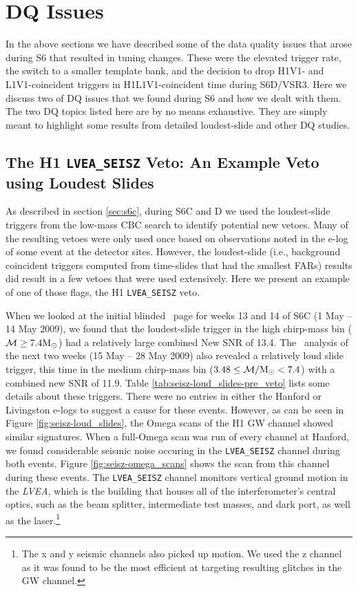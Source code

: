 \section{DQ Issues}
\label{sec:dq_issues}

In the above sections we have described some of the data quality issues that
arose during S6 that resulted in tuning changes. These were the elevated
trigger rate, the switch to a smaller template bank, and the decision to drop
H1V1- and L1V1-coincident triggers in H1L1V1-coincident time during S6D/VSR3.
Here we discuss two of \ac{DQ} issues that we found during \ac{S6} and how we
dealt with them. The two \ac{DQ} topics listed here are by no means exhaustive.
They are simply meant to highlight some results from detailed loudest-slide and
other DQ studies.

\subsection{The H1 \texttt{LVEA\_SEISZ} Veto: An Example Veto using Loudest Slides}
\label{sec:lvea_seismic}

As described in section \ref{sec:s6c}, during S6C and D we used the
loudest-slide triggers from the low-mass \ac{CBC} search to identify potential
new vetoes. Many of the resulting vetoes were only used once based on
observations noted in the e-log of some event at the detector sites. However,
the loudest-slide (i.e., background coincident triggers computed from
time-slides that had the smallest \acp{FAR}) results did result in a few vetoes
that were used extensively. Here we present an example of one of those flags,
the H1 \verb|LVEA_SEISZ| veto.

When we looked at the initial blinded \ihope~page for weeks 13 and 14 of S6C (1
May -- 14 May 2009), we found that the loudest-slide trigger in the high
chirp-mass bin ($\mathcal{M} \geq 7.4\mathrm{M_\odot}$) had a relatively large combined New
\ac{SNR} of 13.4. The \ihope~analysis of the next two weeks (15 May -- 28 May
2009) also revealed a relatively loud slide trigger, this time in the medium
chirp-mass bin ($3.48 \leq \mathcal{M}/\mathrm{M_\odot} < 7.4$) with a combined new \ac{SNR} of
11.9. Table \ref{tab:seisz-loud_slides-pre_veto} lists some details about these
triggers. There were no entries in either the Hanford or Livingston e-logs to
suggest a cause for these events. However, as can be seen in Figure
\ref{fig:seisz-loud_slides}, the Omega scans of the H1 \ac{GW} channel showed
similar signatures. When a full-Omega scan was run of every channel at Hanford,
we found considerable seismic noise occuring in the \verb|LVEA_SEISZ| channel
during both events. Figure \ref{fig:seisz-omega_scans} shows the scan from this
channel during these events. The \verb|LVEA_SEISZ| channel monitors vertical
ground motion in the \emph{LVEA}, which is the building that houses all of the
interferometer's central optics, such as the beam splitter, intermediate test
masses, and dark port, as well as the laser.\footnote{The x and y seismic
channels also picked up motion. We used the z channel as it was found to be the
most efficient at targeting resulting glitches in the \ac{GW} channel.}


